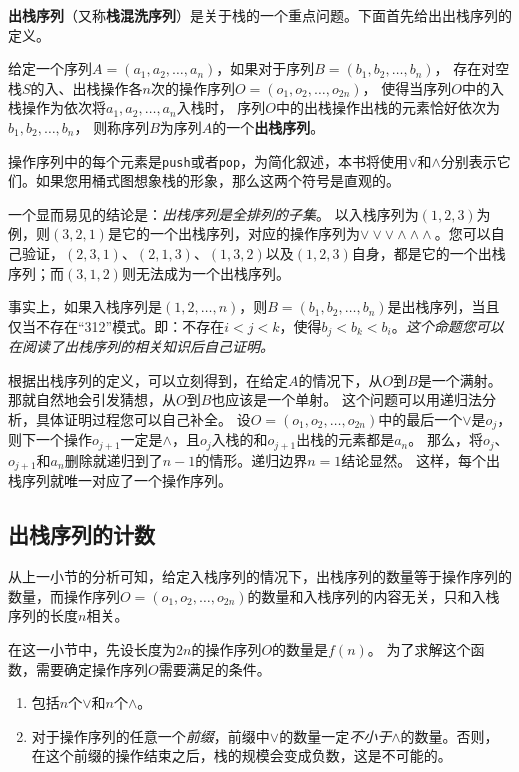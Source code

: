\textbf{出栈序列}（又称\textbf{栈混洗序列}）是关于栈的一个重点问题。下面首先给出出栈序列的定义。

给定一个序列$A=(a_1,a_2,\dots,a_n)$，如果对于序列$B=(b_1,b_2,\dots,b_n)$，
存在对空栈$S$的入、出栈操作各$n$次的操作序列$O=(o_1,o_2,\dots,o_{2n})$，
使得当序列$O$中的入栈操作为依次将$a_1,a_2,\dots,a_n$入栈时，
序列$O$中的出栈操作出栈的元素恰好依次为$b_1,b_2,\dots,b_n$，
则称序列$B$为序列$A$的一个\textbf{出栈序列}。

操作序列中的每个元素是\lstinline{push}或者\lstinline{pop}，为简化叙述，本书将使用$\lor$和$\land$分别表示它们。如果您用桶式图想象栈的形象，那么这两个符号是直观的。

一个显而易见的结论是：\textit{出栈序列是全排列的子集}。
以入栈序列为$(1,2,3)$为例，则$(3,2,1)$是它的一个出栈序列，对应的操作序列为$\lor\lor\lor\land\land\land$。您可以自己验证，$(2,3,1)$、$(2,1,3)$、$(1,3,2)$以及$(1,2,3)$自身，都是它的一个出栈序列；而$(3,1,2)$则无法成为一个出栈序列。

事实上，如果入栈序列是$(1,2,\dots,n)$，则$B=(b_1,b_2,\dots,b_n)$是出栈序列，当且仅当不存在“312”模式。即：不存在$i<j<k$，使得$b_j<b_k<b_i$。\textit{这个命题您可以在阅读了出栈序列的相关知识后自己证明。}

根据出栈序列的定义，可以立刻得到，在给定$A$的情况下，从$O$到$B$是一个满射。
那就自然地会引发猜想，从$O$到$B$也应该是一个单射。
这个问题可以用递归法分析，具体证明过程您可以自己补全。
设$O=(o_1,o_2,\dots,o_{2n})$中的最后一个$\lor$是$o_j$，则下一个操作$o_{j+1}$一定是$\land$，且$o_j$入栈的和$o_{j+1}$出栈的元素都是$a_n$。
那么，将$o_j$、$o_{j+1}$和$a_n$删除就递归到了$n-1$的情形。递归边界$n=1$结论显然。
这样，每个出栈序列就唯一对应了一个操作序列。

\subsection{出栈序列的计数}

从上一小节的分析可知，给定入栈序列的情况下，出栈序列的数量等于操作序列的数量，而操作序列$O=(o_1,o_2,\dots,o_{2n})$的数量和入栈序列的内容无关，只和入栈序列的长度$n$相关。

在这一小节中，先设长度为$2n$的操作序列$O$的数量是$f(n)$。
为了求解这个函数，需要确定操作序列$O$需要满足的条件。

\begin{enumerate}
    \item 包括$n$个$\lor$和$n$个$\land$。
    \item 对于操作序列的任意一个\textit{前缀}，前缀中$\lor$的数量一定\textit{不小于}$\land$的数量。否则，在这个前缀的操作结束之后，栈的规模会变成负数，这是不可能的。
\end{enumerate}

